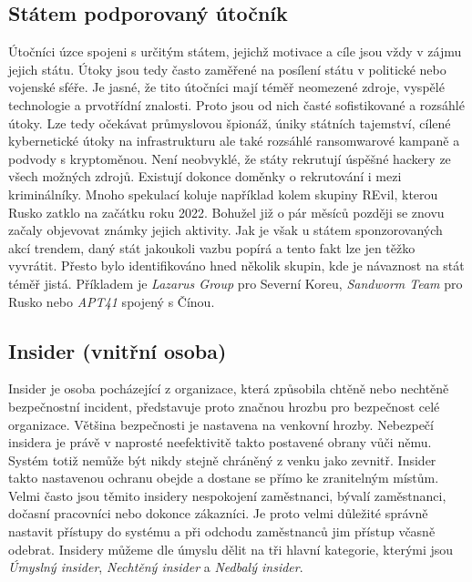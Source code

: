 \subsection{Státem podporovaný útočník}\label{subsec:statem-podporovany-utocnik}
Útočníci úzce spojeni s určitým státem, jejichž motivace a cíle jsou vždy v zájmu jejich státu.
Útoky jsou tedy často zaměřené na posílení státu v politické nebo vojenské sféře.
Je jasné, že tito útočníci mají téměř neomezené zdroje, vyspělé technologie a prvotřídní znalosti.
Proto jsou od nich časté sofistikované a rozsáhlé útoky.
Lze tedy očekávat průmyslovou špionáž, úniky státních tajemství, cílené kybernetické útoky na infrastrukturu ale také rozsáhlé ransomwarové kampaně a podvody s kryptoměnou.
Není neobvyklé, že státy rekrutují úspěšné hackery ze všech možných zdrojů.
Existují dokonce doměnky o rekrutování i mezi kriminálníky.
Mnoho spekulací koluje například kolem skupiny REvil, kterou Rusko zatklo na začátku roku 2022\cite{REvil_story}.
Bohužel již o pár měsíců později se znovu začaly objevovat známky jejich aktivity.
Jak je však u státem sponzorovaných akcí trendem, daný stát jakoukoli vazbu popírá a tento fakt lze jen těžko vyvrátit.
Přesto bylo identifikováno hned několik skupin, kde je návaznost na stát téměř jistá.
Příkladem je \textit{Lazarus Group} pro Severní Koreu, \textit{Sandworm Team} pro Rusko nebo \textit{APT41} spojený s Čínou\cite{Mitre_groups}.

\subsection{Insider (vnitřní osoba)}\label{subsec:insider-(vnitrni-osoba)}
Insider je osoba pocházející z organizace, která způsobila chtěně nebo nechtěně bezpečnostní incident, představuje proto značnou hrozbu pro bezpečnost celé organizace.
Většina bezpečnosti je nastavena na venkovní hrozby.
Nebezpečí insidera je právě v naprosté neefektivitě takto postavené obrany vůči němu.
Systém totiž nemůže být nikdy stejně chráněný z venku jako zevnitř.
Insider takto nastavenou ochranu obejde a dostane se přímo ke zranitelným místům.
Velmi často jsou těmito insidery nespokojení zaměstnanci, bývalí zaměstnanci, dočasní pracovníci nebo dokonce zákazníci.
Je proto velmi důležité správně nastavit přístupy do systému a při odchodu zaměstnanců jim přístup včasně odebrat.
Insidery můžeme dle úmyslu dělit na tři hlavní kategorie, kterými jsou \textit{Úmyslný insider}, \textit{Nechtěný insider} a \textit{Nedbalý insider}.

